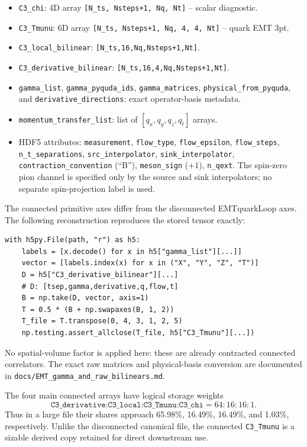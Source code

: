 \documentclass[11pt,a4paper]{article}
\newcommand{\code}[1]{\texttt{#1}}
\begin{document}
\begin{itemize}[nosep]
  \item \code{C3\_chi}: 4D array \code{[N\_ts, Nsteps+1, Nq, Nt]} -- scalar diagnostic.
  \item \code{C3\_Tmunu}: 6D array \code{[N\_ts, Nsteps+1, Nq, 4, 4, Nt]} -- quark EMT 3pt.
  \item \code{C3\_local\_bilinear}: \code{[N\_ts,16,Nq,Nsteps+1,Nt]}.
  \item \code{C3\_derivative\_bilinear}: \code{[N\_ts,16,4,Nq,Nsteps+1,Nt]}.
  \item \code{gamma\_list}, \code{gamma\_pyquda\_ids},
        \code{gamma\_matrices}, \code{physical\_from\_pyquda}, and
        \code{derivative\_directions}: exact operator-basis metadata.
  \item \code{momentum\_transfer\_list}: list of $[q_x, q_y, q_z, q_t]$ arrays.
  \item HDF5 attributes: \code{measurement}, \code{flow\_type}, \code{flow\_epsilon}, \code{flow\_steps}, \code{n\_t\_separations}, \code{src\_interpolator}, \code{sink\_interpolator}, \code{contraction\_convention} (``B''), \code{meson\_sign} ($+1$), \code{n\_qext}. The spin-zero pion channel is specified only by the source and sink interpolators; no separate spin-projection label is used.
\end{itemize}

The connected primitive axes differ from the disconnected EMTquarkLoop axes.  The
following reconstruction reproduces the stored tensor exactly:
\begin{verbatim}
with h5py.File(path, "r") as h5:
    labels = [x.decode() for x in h5["gamma_list"][...]]
    vector = [labels.index(x) for x in ("X", "Y", "Z", "T")]
    D = h5["C3_derivative_bilinear"][...]
    # D: [tsep,gamma,derivative,q,flow,t]
    B = np.take(D, vector, axis=1)
    T = 0.5 * (B + np.swapaxes(B, 1, 2))
    T_file = T.transpose(0, 4, 3, 1, 2, 5)
    np.testing.assert_allclose(T_file, h5["C3_Tmunu"][...])
\end{verbatim}
No spatial-volume factor is applied here: these are already contracted
connected correlators.  The exact raw matrices and physical-basis conversion
are documented in \code{docs/EMT\_gamma\_and\_raw\_bilinears.md}.

The four main connected arrays have logical storage weights
\begin{equation}
\code{C3\_derivative:C3\_local:C3\_Tmunu:C3\_chi}=64:16:16:1.
\end{equation}
Thus in a large file their shares approach 65.98\%, 16.49\%, 16.49\%, and
1.03\%, respectively.  Unlike the disconnected canonical file, the connected
\code{C3\_Tmunu} is a sizable derived copy retained for direct downstream use.
\end{document}
